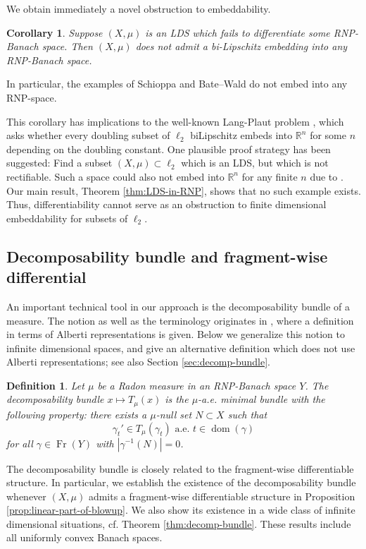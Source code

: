\documentclass{amsart}
\newtheorem{corollary}[theorem]{Corollary}
\newtheorem{definition}[theorem]{Definition}
\numberwithin{equation}{section}
\newcommand{\R}{\mathbb{R}}
\newcommand{\dom}{\operatorname{dom}}
\newcommand{\Fr}{\operatorname{Fr}}
\newcommand{\inv}{^{-1}}
\begin{document}
We obtain immediately a novel obstruction to embeddability.
\begin{corollary}
Suppose $(X,\mu)$ is an LDS which fails to differentiate some RNP-Banach space. Then $(X,\mu)$ does not admit a bi-Lipschitz embedding into any RNP-Banach space.
\end{corollary}
In particular, the examples of Schioppa \cite{schioppadiff} and Bate--Wald \cite{waldbate} do not embed into any RNP-space.

This corollary has implications to the well-known Lang-Plaut problem \cite[Question 2.4]{langplaut}, which asks whether every doubling subset of $\ell_2$ biLipschitz embeds into $\R^n$ for some $n$ depending on the doubling constant. One plausible proof strategy has been suggested: Find a subset $(X,\mu)\subset \ell_2$ which is an LDS, but which is not rectifiable. Such a space could also not embed into $\R^n$ for any finite $n$ due to \cite[Theorem 14.2]{che99}. Our main result, Theorem \ref{thm:LDS-in-RNP}, shows that no such example exists. Thus, differentiability cannot serve as an obstruction to finite dimensional embeddability for subsets of $\ell_2$.

\subsection{Decomposability bundle and fragment-wise differential}
An important technical tool in our approach is the decomposability bundle of a measure. The notion as well as the terminology originates in \cite{almar16}, where a definition in terms of Alberti representations is given. Below we generalize this notion to infinite dimensional spaces, and give an alternative definition which does not use Alberti representations; see also Section \ref{sec:decomp-bundle}.

\begin{definition}\label{def:decomp-bundle}
Let $\mu$ be a Radon measure in an RNP-Banach space $Y$. The decomposability bundle $x\mapsto T_\mu(x)$ is the $\mu$-a.e. minimal bundle with the following property: there exists a $\mu$-null set $N\subset X$ such that
\[
\gamma_t' \in T_\mu({\gamma_t}) \text{ a.e. } t\in \dom(\gamma)
\]
for all $\gamma\in \Fr(Y)$ with $|\gamma\inv(N)|=0$.
\end{definition}

The decomposability bundle is closely related to the fragment-wise differentiable structure. In particular, we establish the existence of the decomposability bundle whenever $(X,\mu)$ admits a fragment-wise differentiable structure in Proposition \ref{prop:linear-part-of-blowup}. We also show its existence in a wide class of  infinite dimensional situations, cf. Theorem \ref{thm:decomp-bundle}. These results include all uniformly convex Banach spaces.
\end{document}
